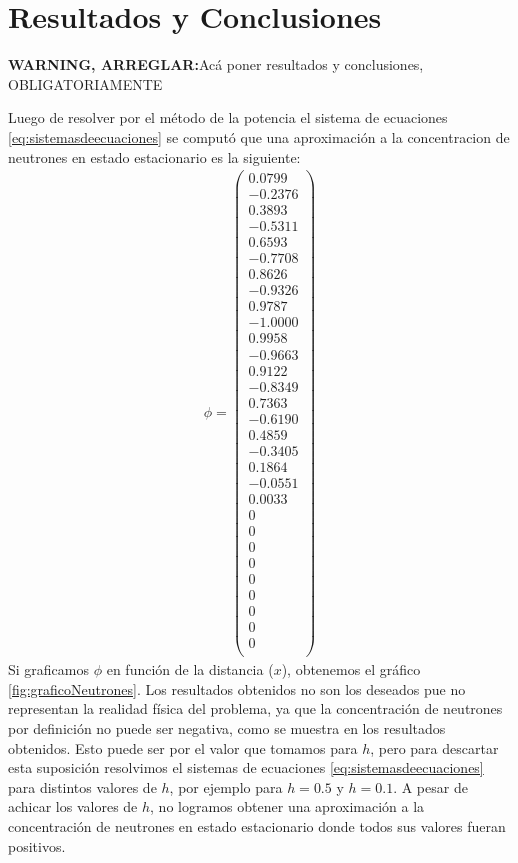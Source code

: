 \documentclass[11pt,a4paper]{emulateapj}
\def \warn {{\sffamily\bfseries\large WARNING, ARREGLAR:}}
\begin{document}
\section{Resultados y Conclusiones}
\label{sec:resultadosyconclusiones}
\warn Acá poner resultados y conclusiones, OBLIGATORIAMENTE

Luego de resolver por el método de la potencia el sistema de ecuaciones \ref{eq:sistemasdeecuaciones} se computó que una aproximación a la concentracion de neutrones en estado estacionario es la siguiente:
\begin{eqnarray}
\phi = \left( \begin{array}{c}
    0.0799\\
   -0.2376\\
    0.3893\\
   -0.5311\\
    0.6593\\
   -0.7708\\
    0.8626\\
   -0.9326\\
    0.9787\\
   -1.0000\\
    0.9958\\
   -0.9663\\
    0.9122\\
   -0.8349\\
    0.7363\\
   -0.6190\\
    0.4859\\
   -0.3405\\
    0.1864\\
   -0.0551\\
    0.0033\\
         0\\
         0\\
         0\\
         0\\
         0\\
         0\\
         0\\
         0\\
         0\\
\end{array} \right)
\end{eqnarray}
Si graficamos $\phi$ en función de la distancia ($x$), obtenemos el gráfico \ref{fig:graficoNeutrones}. Los resultados obtenidos no son los deseados pue no representan la realidad física del problema, ya que la concentración de neutrones por definición no puede ser negativa, como se muestra en los resultados obtenidos. Esto puede ser por el valor que tomamos para $h$, pero para descartar esta suposición resolvimos el sistemas de ecuaciones \ref{eq:sistemasdeecuaciones} para distintos valores de $h$, por ejemplo para $h=0.5$ y $h=0.1$. A pesar de achicar los valores de $h$, no logramos obtener una aproximación a la concentración de neutrones en estado estacionario donde todos sus valores fueran positivos.
\end{document}
